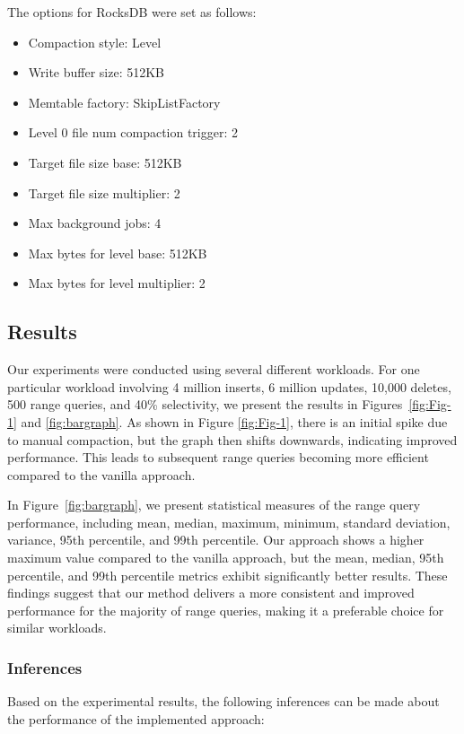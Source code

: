 \documentclass[balance=false, sigconf]{acmart}
\begin{document}
The options for RocksDB were set as follows:

\begin{itemize}
  \item Compaction style: Level
  \item Write buffer size: 512KB
  \item Memtable factory: SkipListFactory
  \item Level 0 file num compaction trigger: 2
  \item Target file size base: 512KB
  \item Target file size multiplier: 2
  \item Max background jobs: 4
  \item Max bytes for level base: 512KB
  \item Max bytes for level multiplier: 2
\end{itemize}

\subsection{Results}

Our experiments were conducted using several different workloads. For one particular workload involving 4 million inserts, 6 million updates, 10,000 deletes, 500 range queries, and 40\% selectivity, we present the results in Figures~\ref{fig:Fig-1} and \ref{fig:bargraph}. As shown in Figure \ref{fig:Fig-1}, there is an initial spike due to manual compaction, but the graph then shifts downwards, indicating improved performance. This leads to subsequent range queries becoming more efficient compared to the vanilla approach.

In Figure~\ref{fig:bargraph}, we present statistical measures of the range query performance, including mean, median, maximum, minimum, standard deviation, variance, 95th percentile, and 99th percentile. Our approach shows a higher maximum value compared to the vanilla approach, but the mean, median, 95th percentile, and 99th percentile metrics exhibit significantly better results. These findings suggest that our method delivers a more consistent and improved performance for the majority of range queries, making it a preferable choice for similar workloads.

\subsubsection{Inferences}

Based on the experimental results, the following inferences can be made about the performance of the implemented approach:
\end{document}
